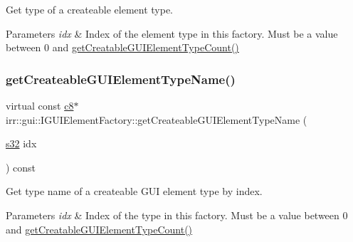 Get type of a createable element type. 


\begin{DoxyParams}{Parameters}
{\em idx} & Index of the element type in this factory. Must be a value between 0 and \hyperlink{classirr_1_1gui_1_1IGUIElementFactory_aae56378de5264978e70d11a36fff02e9}{get\+Creatable\+G\+U\+I\+Element\+Type\+Count()} \\
\hline
\end{DoxyParams}
\mbox{\label{classirr_1_1gui_1_1IGUIElementFactory_aa8007c17ea40b74666c1d04c9d4de85f}} 
\subsubsection{\texorpdfstring{get\+Createable\+G\+U\+I\+Element\+Type\+Name()}{getCreateableGUIElementTypeName()}\hspace{0.1cm}{\footnotesize\ttfamily [1/2]}}
{\footnotesize\ttfamily virtual const \hyperlink{namespaceirr_a9395eaea339bcb546b319e9c96bf7410}{c8}$\ast$ irr\+::gui\+::\+I\+G\+U\+I\+Element\+Factory\+::get\+Createable\+G\+U\+I\+Element\+Type\+Name (\begin{DoxyParamCaption}\item[{\hyperlink{namespaceirr_ac66849b7a6ed16e30ebede579f9b47c6}{s32}}]{idx }\end{DoxyParamCaption}) const\hspace{0.3cm}{\ttfamily [pure virtual]}}



Get type name of a createable G\+UI element type by index. 


\begin{DoxyParams}{Parameters}
{\em idx} & Index of the type in this factory. Must be a value between 0 and \hyperlink{classirr_1_1gui_1_1IGUIElementFactory_aae56378de5264978e70d11a36fff02e9}{get\+Creatable\+G\+U\+I\+Element\+Type\+Count()} \\
\hline
\end{DoxyParams}
\mbox{\label{classirr_1_1gui_1_1IGUIElementFactory_a1e692e1f746ee69815bf25981ee0facf}} 
